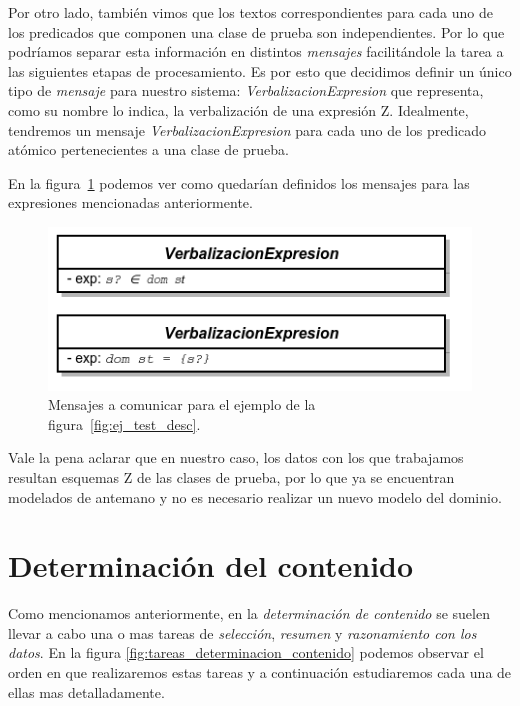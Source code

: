 \bigskip
Por otro lado, también vimos que los textos correspondientes para cada uno de los predicados que componen una clase de prueba son independientes. Por lo que podríamos separar esta información en distintos \emph{mensajes} facilitándole la tarea a las siguientes etapas de procesamiento. Es por esto que decidimos definir un único tipo de \emph{mensaje} para nuestro sistema: \emph{VerbalizacionExpresion} que representa, como su nombre lo indica, la verbalización de una expresión Z. Idealmente, tendremos un mensaje \emph{VerbalizacionExpresion} para cada uno de los predicado atómico pertenecientes a una clase de prueba.

En la figura~\ref{fig:ej_mensajes} podemos ver como quedarían definidos los mensajes para las expresiones mencionadas anteriormente.

\begin{figure}[H]
  	\centering
	\includegraphics[scale=0.4]{img/mensajes.png}
	\caption{Mensajes a comunicar para el ejemplo de la figura~\ref{fig:ej_test_desc}.}
  	\label{fig:ej_mensajes}
\end{figure}

Vale la pena aclarar que en nuestro caso, los datos con los que trabajamos resultan esquemas Z de las clases de prueba, por lo que ya se encuentran modelados de antemano y no es necesario realizar un nuevo modelo del dominio.
 

\section{Determinación del contenido}
\label{cap:determinacion_contenido}

Como mencionamos anteriormente, en la \emph{determinación de contenido} se suelen llevar a cabo una o mas tareas de \emph{selección}, \emph{resumen} y \emph{razonamiento con los datos}. En la figura \ref{fig:tareas_determinacion_contenido} podemos observar el orden en que realizaremos estas tareas y a continuación estudiaremos cada una de ellas mas detalladamente.

